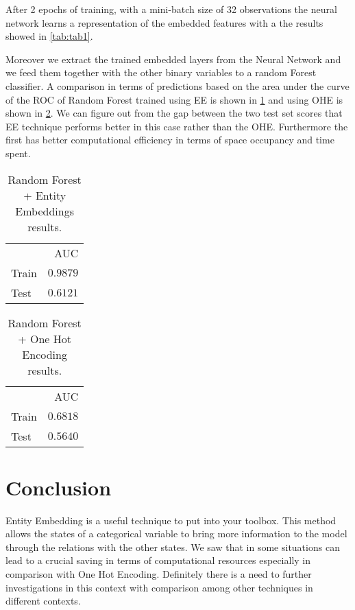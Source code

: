 \documentclass{article}
\begin{document}
After 2 epochs of training, with a mini-batch size of 32 observations the neural network learns a representation of the embedded features with a the results showed in \cref{tab:tab1}.

Moreover we extract the trained embedded layers from the Neural Network and we feed them together with the other binary variables to a random Forest classifier.
A comparison in terms of predictions based on the area under the curve of the ROC of Random Forest trained using EE is shown in \cref{tab:tab2} and using OHE is shown in \cref{tab:tab3}. We can figure out from the gap between the two test set scores that EE technique performs better in this case rather than the OHE. Furthermore the first has better computational efficiency in terms of space occupancy and time spent.

\begin{table}[h]
  \caption{Random Forest + Entity Embeddings results.}
  \label{tab:tab2}
  \centering
  \begin{tabular}{lr}
    \toprule
    \multicolumn{2}{r}{AUC} \\
    \cmidrule(r){1-2}
    Train   & $0.9879$        \\
    Test    & $\bm{0.6121}$ \\
    \bottomrule
  \end{tabular}
\end{table}
\begin{table}[h]
    \caption{Random Forest + One Hot Encoding results.}
  \label{tab:tab3}
  \centering
  \begin{tabular}{lr}
    \toprule
    \multicolumn{2}{r}{AUC} \\
    \cmidrule(r){1-2}
    Train   & $0.6818$     \\
    Test    & $\bm{0.5640}$ \\
    \bottomrule
  \end{tabular}
\end{table}

\section{Conclusion}
Entity Embedding is a useful technique to put into your toolbox. This method allows the states of a categorical variable to bring more information to the model through the relations with the other states.
We saw that in some situations can lead to a crucial saving in terms of computational resources especially in comparison with One Hot Encoding.
Definitely there is a need to further investigations in this context with comparison among other techniques in different contexts.
\end{document}

